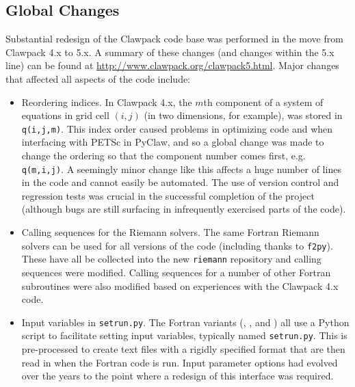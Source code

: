 %
%
%

\subsection{Global Changes}
Substantial redesign of the Clawpack code base was performed in the move
from Clawpack 4.x to 5.x.  A summary of these changes (and changes within
the 5.x line) can be found at \url{http://www.clawpack.org/clawpack5.html}.
Major changes that affected all aspects of the code include:
\begin{itemize}
    \item Reordering indices.  In Clawpack 4.x, the $m$th component of a
system of equations in grid cell $(i,j)$ (in two dimensions, for example),
was stored in \texttt{q(i,j,m)}.  This index order caused problems in
optimizing code and when interfacing with PETSc in PyClaw, and so a global
change was made to change the ordering so that the component number comes
first, e.g. \texttt{q(m,i,j)}.  A seemingly minor change like this affects a
huge number of lines in the code and cannot easily be automated. The use of
version control and regression tests was crucial in the successful
completion of the project (although bugs are still surfacing in infrequently
exercised parts of the code).
    \item Calling sequences for the Riemann solvers.  The same Fortran
Riemann solvers can be used for all versions of the code (including \pyclaw
thanks to \texttt{f2py}).  These have all be collected into the new
\texttt{riemann} repository and calling sequences were modified.  Calling
sequences for a number of other Fortran subroutines were also modified based
on experiences with the Clawpack 4.x code.
    \item Input variables in \texttt{setrun.py}.  The Fortran variants
(\classic, \amrclaw, and \geoclaw) all use a Python script to facilitate
setting input variables, typically named \texttt{setrun.py}.  This is
pre-processed to create text files with a rigidly specified format that are
then read in when the Fortran code is run.  Input parameter options had
evolved over the years to the point where a redesign of this interface was
required.
\end{itemize}
